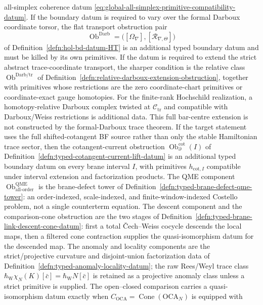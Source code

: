 \begin{thm}
all-simplex coherence datum
\eqref{eq:global-all-simplex-primitive-compatibility-datum}.  If the boundary datum is
required to vary over the formal Darboux coordinate torsor, the flat
transport obstruction pair
\[
  \operatorname{Ob}^{\mathrm{Darb}}
  =
  \bigl([\Omega_{\nabla}],
        [\mathcal R_{\nabla,\Theta}]\bigr)
\]
of Definition~\ref{defn:hol-bd-datum-HT} is an additional typed
boundary datum and must be killed by its own primitives.  If the datum is
required to extend the strict abstract trace-coordinate transport, the sharper
condition is the relative class
\(\operatorname{Ob}^{\mathrm{Darb}/\mathrm{tr}}\) of
Definition~\ref{defn:relative-darboux-extension-obstruction}, together
with primitives whose restrictions are the zero coordinate-chart
primitives or coordinate-exact gauge homotopies.  For the finite-rank
Hochschild realization, a homotopy-relative Darboux complex twisted at
\(\mathcal C_{\mathrm{tr}}\) and compatible with Darboux/Weiss
restrictions is additional data.  This full bar-centre extension is not
constructed by the formal-Darboux trace theorem.  If the target statement
uses the full shifted-cotangent BF source rather than only the stable
Hamiltonian trace sector, then the cotangent-current obstruction
\(\operatorname{Ob}^{\mathrm{cot}}_\partial(I)\) of
Definition~\ref{defn:typed-cotangent-current-lift-datum} is an
additional typed boundary datum on every brane interval \(I\), with
primitives \(h_{\mathrm{cot},I}\) compatible under interval extension
and factorization products.  The QME component
\(\operatorname{Ob}^{\mathrm{QME}}_{\mathrm{all\mbox{-}order}}\) is
the brane-defect tower of
Definition~\ref{defn:typed-brane-defect-qme-tower}: an order-indexed,
scale-indexed, and finite-window-indexed Costello problem, not a single
counterterm equation.  The descent component and the comparison-cone
obstruction are the two stages of
Definition~\ref{defn:typed-brane-link-descent-cone-datum}: first a
total \v{C}ech--Weiss cocycle descends the local maps, then a filtered
cone contraction supplies the quasi-isomorphism datum for the descended
map.  The
anomaly and locality components are the strict/projective curvature and
disjoint-union factorization data of
Definition~\ref{defn:typed-anomaly-locality-datum}; the raw Rees/Weyl
trace class \(\hbar_{\mathrm{W}}\chi_N(K)[\bar c]
=\hbar_{\mathrm{W}}N[\bar c]\) is retained as a projective anomaly class
unless a strict primitive is supplied.  The
open--closed comparison carries a quasi-isomorphism datum exactly when
  \(C_{\mathrm{OCA}}=\operatorname{Cone}(\mathrm{OCA}_N)\) is equipped with

\end{thm}
